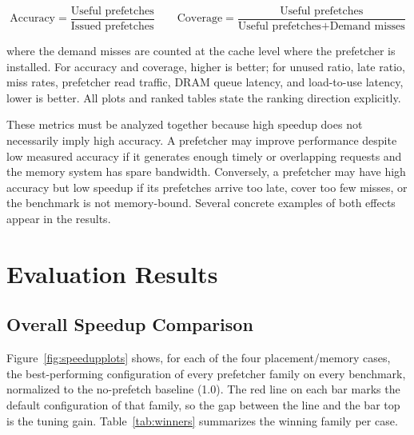 \documentclass[12pt, letterpaper]{article}
\begin{document}
\begin{equation}
\text{Accuracy} =
\frac{\text{Useful prefetches}}{\text{Issued prefetches}}
\qquad
\text{Coverage} =
\frac{\text{Useful prefetches}}
{\text{Useful prefetches} + \text{Demand misses}}
\end{equation}

\noindent where the demand misses are counted at the cache level where the prefetcher is installed. For accuracy and coverage, higher is better; for unused ratio, late ratio, miss rates, prefetcher read traffic, DRAM queue latency, and load-to-use latency, lower is better. All plots and ranked tables state the ranking direction explicitly.

\noindent These metrics must be analyzed together because high speedup does not necessarily imply high accuracy. A prefetcher may improve performance despite low measured accuracy if it generates enough timely or overlapping requests and the memory system has spare bandwidth. Conversely, a prefetcher may have high accuracy but low speedup if its prefetches arrive too late, cover too few misses, or the benchmark is not memory-bound. Several concrete examples of both effects appear in the results.

\FloatBarrier
\section{Evaluation Results}
\label{sec:eval:res}


\subsection{Overall Speedup Comparison}
\label{sec:res:speedup}

Figure~\ref{fig:speedupplots} shows, for each of the four placement/memory cases, the best-performing configuration of every prefetcher family on every benchmark, normalized to the no-prefetch baseline (1.0). The red line on each bar marks the default configuration of that family, so the gap between the line and the bar top is the tuning gain. Table~\ref{tab:winners} summarizes the winning family per case.
\end{document}
